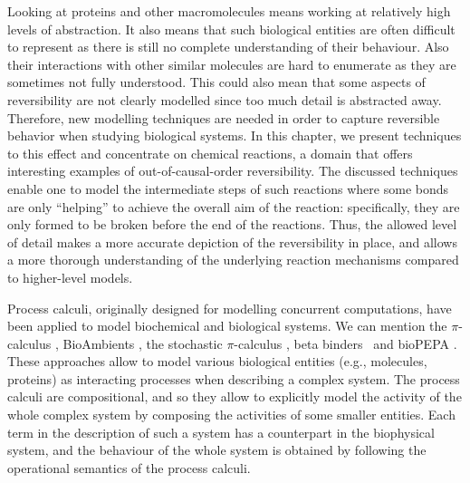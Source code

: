 \documentclass[runningheads]{llncs}
\begin{document}
Looking at proteins and other macromolecules means working at relatively
high  levels  of  abstraction.   It  also  means  that  such  biological  entities  are  often  difficult  to  represent  as  there  is  still  no  complete  understanding  of  their
behaviour.  Also their interactions with other similar molecules are hard to enumerate as they are sometimes not fully understood. This could also mean that some aspects of reversibility are not clearly modelled since  too  much
detail is abstracted away. Therefore,  new modelling techniques are needed in order to capture reversible behavior when studying biological systems. In this chapter, we present techniques to this effect and concentrate on chemical reactions, a domain that offers
interesting examples of out-of-causal-order reversibility. %
The discussed techniques enable one to model the intermediate steps of such reactions where some bonds are
only ``helping'' to achieve the overall aim of the reaction:  specifically, they are only formed to be
broken before the end of the reactions.  Thus, the allowed level of detail 
makes a more accurate depiction of the reversibility in place, and allows a more thorough understanding of the underlying reaction mechanisms 
compared to higher-level models.


Process calculi, originally designed for modelling concurrent computations, have been applied to model biochemical and biological systems. We can mention the $\pi$-calculus \cite{MilnerPi,Regev2004}, BioAmbients \cite{RegevBioambients}, the stochastic $\pi$-calculus \cite{PriamiStochasticPi}, beta binders~\cite{betabinders} and bioPEPA \cite{CiocchettaBiopepa}. These approaches allow to model various biological entities (e.g., molecules, proteins) as interacting processes when describing a complex system. The process calculi are compositional, and so they allow to explicitly model the activity of the whole complex system by composing the activities of some smaller entities. Each term in the description of such a system has a counterpart in the biophysical system, and the behaviour of the whole system is obtained by following the operational semantics of the process calculi.
\end{document}
